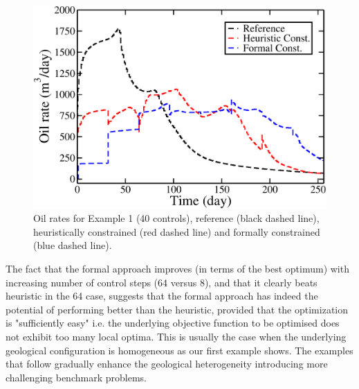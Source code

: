 \documentclass[twocolumn,numbook]{svjour3}          %
\begin{document}
\begin{figure}
\begin{center}
\includegraphics[totalheight=2.2in,angle=0]{OilRatesSteps8.pdf}
\end{center}
\caption{Oil rates for Example 1 (40 controls), reference (black dashed line), heuristically constrained (red dashed line)
 and formally constrained (blue dashed line).} 
\label{fig:PIOilRates}
\end{figure}

%



The fact that the formal approach improves (in terms of the best optimum) with increasing number of control steps (64 versus 8), and that it clearly beats heuristic in the 64 case, suggests that the formal approach has indeed the potential of performing better than the heuristic, provided that the optimization is "sufficiently easy" i.e. the underlying objective function to be optimised does not exhibit too many local optima. This is usually the case when the underlying geological configuration is homogeneous as our first example shows. The examples that follow gradually enhance the geological heterogeneity introducing more challenging benchmark problems.
\end{document}
